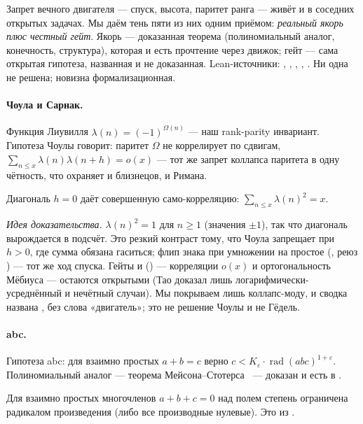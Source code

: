 Запрет вечного двигателя — спуск, высота, паритет ранга — живёт и в соседних открытых задачах. Мы
даём тень пяти из них одним приёмом: \emph{реальный якорь  плюс честный гейт}. Якорь —
доказанная теорема (полиномиальный аналог, конечность, структура), которая и есть прочтение через
движок; гейт — сама открытая гипотеза, названная и не доказанная. Lean-источники:
, , , ,
. Ни одна не решена; новизна формализационная.

\paragraph{Чоула и Сарнак.}
Функция Лиувилля $\lambda(n)=(-1)^{\Omega(n)}$ — наш rank-parity инвариант. Гипотеза Чоулы говорит:
паритет $\Omega$ не коррелирует по сдвигам, $\sum_{n\le x}\lambda(n)\lambda(n+h)=o(x)$ — тот же
запрет коллапса паритета в одну чётность, что охраняет и близнецов, и Римана.

\begin{theorem}\label{thm:chowlaCorrelation_zero_eq_card}
\green{} Диагональ $h=0$ даёт совершенную само-корреляцию:
$\sum_{n\le x}\lambda(n)^2=x$.
\end{theorem}

\emph{Идея доказательства.} $\lambda(n)^2=1$ для $n\ge 1$ (значения $\pm1$), так что диагональ
вырождается в подсчёт. Это резкий контраст тому, что Чоула запрещает при $h>0$, где сумма обязана
гаситься; флип знака при умножении на простое (, реюз
) — тот же ход спуска. Гейты  и 
(\red{}) — корреляции $o(x)$ и ортогональность Мёбиуса — остаются открытыми (Тао доказал лишь
логарифмически-усреднённый и нечётный случаи). Мы покрываем лишь коллапс-моду, и сводка названа
, без слова «двигатель»; это не решение Чоулы и не Гёдель.

\paragraph{abc.}
Гипотеза abc: для взаимно простых $a+b=c$ верно
$c<K_\varepsilon\cdot\operatorname{rad}(abc)^{1+\varepsilon}$. Полиномиальный аналог — теорема
Мейсона–Стотерса~\cite{mason1984,stothers1981} — доказан и есть в .

\begin{theorem}\label{thm:polynomial_abc_shadow}
\green{} Для взаимно простых многочленов $a+b+c=0$ над полем степень ограничена радикалом
произведения (либо все производные нулевые). Это  из .
\end{theorem}


